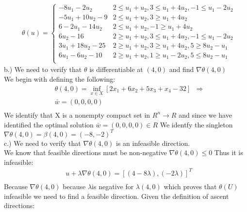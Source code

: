 \documentclass[12pt]{article}
\begin{document}
         \begin{align*}
            &\theta(u) = 
                \begin{cases} 
                    -8u_1 - 2u_2 & 2 \leq u_1 + u_2 , 3 \leq u_1 + 4u_2, -1 \leq u_1 -2u_2\\
                    -5u_1 + 10u_2 -9 & 2 \leq u_1 + u_2 , 3 \geq u_1 + 4u_2 \\
                    6 - 2u_1 - 14u_2 & 2 \leq u_1 + u_2, -1 \geq u_1 + 4u_2\\
                    6u_2 - 16 & 2 \geq u_1 + u_2 , 3 \leq u_1 + 4 u_2, -1\leq u_1 - 2u_2\\
                    3u_1 + 18u_2 - 25 & 2 \geq u_1 + u_2, 3 \geq u_1 + 4u_2 , 5\geq 8u_2 - u_1 \\ 
                    6u_1 - 6 u_2 - 10 & 2 \geq u_1 + u_2 , 1 \geq u_1 -2u_2, 5 \leq 8u_2 - u_1 \\ 
                \end{cases}
        \end{align*}
    b.) We need to verify that $\theta$ is differentiable at $(4,0)$ and find $\nabla \theta (4,0)$\\
    We begin with defining the following:\\
        \begin{align*}
            &\theta(4,0) = \inf_{x \in X} [2x_1 + 6x_2 + 5x_3 + x_4 - 32]
            &\Rightarrow\\
            &\bar w =  (0,0,0,0)\\
        \end{align*}
    We identify that X is a nonempty compact set in $R^n \rightarrow R$ and since we have identified the optimal solution $\bar w = (0,0,0,0) \in R $ We identfy the singleton $\nabla \theta (4,0) = \beta(4,0) = (-8, -2)^T$\\
    c.) We need to verify that $\nabla \theta(4,0)$ is an infeasible direction. \\
    We know that feasible directions must be non-negative $\nabla \theta(4,0) \leq 0$ Thus it is infeasible: \\
        \begin{align*}
            &u + \lambda \nabla \theta (4,0) = [(4-8\lambda), (-2\lambda)]^T\\
        \end{align*}
    Because $\nabla \theta (4,0)$ because $\lambda $is negative for $\lambda (4,0)$ which proves that $\theta (U) $ infeasible we need to find a feasible direction. Given the definition of ascent directions: \\
\end{document}
